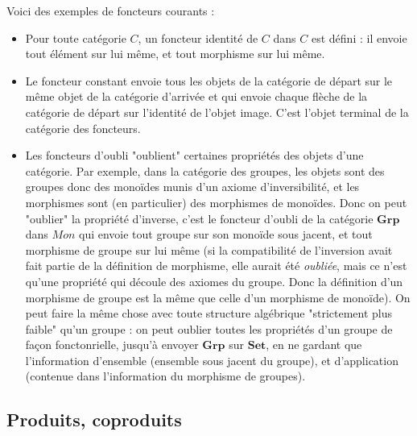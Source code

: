 \documentclass{article}
\begin{document}
Voici des exemples de foncteurs courants : 
\begin{itemize}
    \item Pour toute catégorie $C$, un foncteur identité de $C$ dans $C$ est défini : il envoie tout élément sur lui même, et tout morphisme sur lui même. 
    \item Le foncteur constant  envoie tous les objets de la catégorie de départ sur le même objet de la catégorie d'arrivée et qui envoie chaque flèche de la catégorie de départ sur l'identité de l'objet image. C'est l'objet terminal de la catégorie des foncteurs.
    \item Les foncteurs d'oubli "oublient" certaines propriétés des objets d'une catégorie. Par exemple, dans la catégorie des groupes, les objets sont des groupes donc des monoïdes munis d'un axiome d'inversibilité, et les morphismes sont (en particulier) des morphismes de monoïdes. Donc on peut "oublier" la propriété d'inverse, c'est le foncteur d'oubli de la catégorie $\mathbf{Grp}$ dans $Mon$ qui envoie tout groupe sur son monoïde sous jacent, et tout morphisme de groupe sur lui même (si la compatibilité de l'inversion avait fait partie de la définition de morphisme, elle aurait été \textit{oubliée}, mais ce n'est qu'une propriété qui découle des axiomes du groupe. Donc la définition d'un morphisme de groupe est la même que celle d'un morphisme de monoïde). On peut faire la même chose avec toute structure algébrique "strictement plus faible" qu'un groupe : on peut oublier toutes les propriétés d'un groupe de façon fonctonrielle, jusqu'à envoyer $\mathbf{Grp}$ sur $\mathbf{Set}$, en ne gardant que l'information d'ensemble (ensemble sous jacent du groupe), et d'application (contenue dans l'information du morphisme de groupes). 
\end{itemize}

\subsection{Produits, coproduits}
\end{document}
